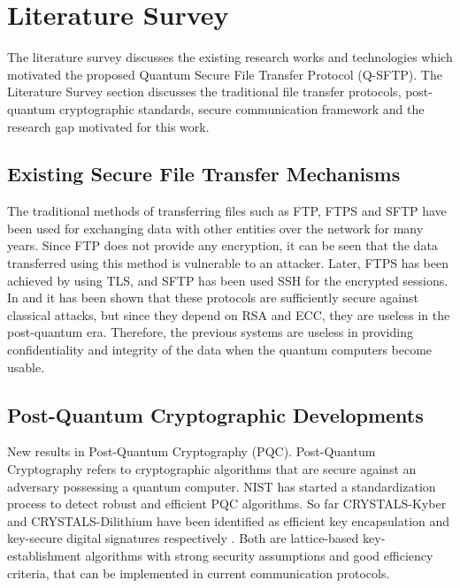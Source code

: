 \chapter{Literature Survey}
\label{chap.3}

 The literature survey discusses the existing research works and technologies which motivated the proposed Quantum Secure File Transfer Protocol (Q-SFTP). The Literature Survey section discusses the traditional file transfer protocols, post-quantum cryptographic standards, secure communication framework and the research gap motivated for this work.

\section{Existing Secure File Transfer Mechanisms}

The traditional methods of transferring files such as FTP, FTPS and SFTP have been used for exchanging data with other entities over the network for many years. Since FTP does not provide any encryption, it can be seen that the data transferred using this method is vulnerable to an attacker. Later, FTPS has been achieved by using TLS, and SFTP has been used SSH for the encrypted sessions. In \cite{krawczyk2020tls13} and \cite{bos2023pqftp} it has been shown that these protocols are sufficiently secure against classical attacks, but since they depend on RSA and ECC, they are useless in the post-quantum era. Therefore, the previous systems are useless in providing confidentiality and integrity of the data when the quantum computers become usable.

\section{Post-Quantum Cryptographic Developments}

New results in Post-Quantum Cryptography (PQC).
Post-Quantum Cryptography refers to cryptographic algorithms that are secure against an adversary possessing a quantum computer. NIST has started a standardization process to detect robust and efficient PQC algorithms. So far CRYSTALS-Kyber and CRYSTALS-Dilithium have been identified as efficient key encapsulation and key-secure digital signatures respectively \cite{avanzi2021kyber, dam2023survey}. Both are lattice-based key-establishment algorithms with strong security assumptions and good efficiency criteria, that can be implemented in current communication protocols.

